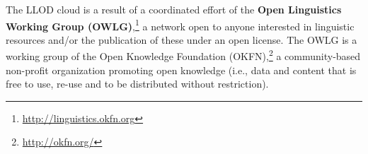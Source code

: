 








The LLOD cloud is a result of a coordinated effort of the {\bf Open Linguistics Working Group (OWLG)},\footnote{\url{http://linguistics.okfn.org}} a network open to anyone interested in linguistic resources and/or the publication of these under an open license. The OWLG is a working group of the Open Knowledge Foundation (OKFN),\footnote{\url{http://okfn.org/}} a community-based non-profit organization promoting open knowledge (i.e., data and content that is free to use, re-use and to be distributed without restriction).


